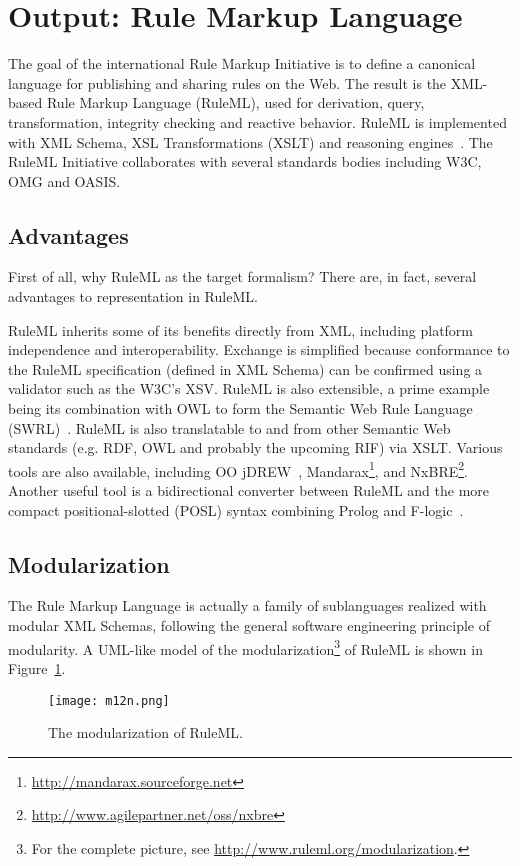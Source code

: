 \documentclass[12pt]{article}
\begin{document}
\section{Output: Rule Markup Language}
The goal of the international Rule Markup Initiative is to define a canonical language for publishing and sharing rules on the Web. The result is the XML-based Rule Markup Language (RuleML), used for derivation, query, transformation, integrity checking and reactive behavior. RuleML is implemented with XML Schema, XSL Transformations (XSLT) and reasoning engines~\cite{impl}. The RuleML Initiative collaborates with several standards bodies including W3C, OMG and OASIS.

\subsection{Advantages}
First of all, why RuleML as the target formalism? There are, in fact, several advantages to representation in RuleML.

RuleML inherits some of its benefits directly from XML, including platform independence and interoperability. Exchange is simplified because conformance to the RuleML specification (defined in XML Schema) can be confirmed using a validator such as the W3C's XSV. RuleML is also extensible, a prime example being its combination with OWL to form the Semantic Web Rule Language (SWRL)~\cite{swrl}. RuleML is also translatable to and from other Semantic Web standards (e.g. RDF, OWL and probably the upcoming RIF) via XSLT. Various tools are also available, including OO jDREW~\cite{ball}, Mandarax\footnote{\url{http://mandarax.sourceforge.net}}, and NxBRE\footnote{\url{http://www.agilepartner.net/oss/nxbre}}. Another useful tool is a bidirectional converter between RuleML and the more compact positional-slotted (POSL) syntax combining Prolog and F-logic~\cite{posl}.

\subsection{Modularization}

The Rule Markup Language is actually a family of sublanguages realized with modular XML Schemas, following the general software engineering principle of modularity. A UML-like model of the modularization\footnote{For the complete picture, see \url{http://www.ruleml.org/modularization}.} of RuleML is shown in Figure~\ref*{fig:m12n}.

\begin{figure}[!htbp]
	\begin{center}
		\texttt{[image: m12n.png]}
	\caption{The modularization of RuleML.}
	\label{fig:m12n}
	\end{center}
\end{figure}
\end{document}
